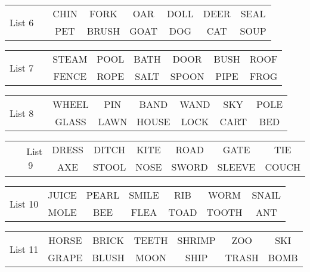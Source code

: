 \documentclass{article}
\begin{document}
\vspace{.1in}
\hspace{.5in}\begin{tabular}{r||c c c c c c }
\multirow{2}{*}{List 6~~} & CHIN & FORK & OAR & DOLL & DEER & SEAL\\
\cline{2-7}			& PET & BRUSH & GOAT & DOG & CAT & SOUP\\
\end{tabular}

\vspace{.1in}
\hspace{.5in}\begin{tabular}{r||c c c c c c }
\multirow{2}{*}{List 7~~} & STEAM & POOL & BATH & DOOR & BUSH & ROOF\\
\cline{2-7}			& FENCE & ROPE & SALT & SPOON & PIPE & FROG\\
\end{tabular}

\vspace{.1in}
\hspace{.5in}\begin{tabular}{r||c c c c c c }
\multirow{2}{*}{List 8~~} & WHEEL & PIN & BAND & WAND & SKY & POLE\\
\cline{2-7}			& GLASS & LAWN & HOUSE & LOCK & CART & BED\\
\end{tabular}

\vspace{.1in}
\hspace{.5in}\begin{tabular}{r||c c c c c c }
\multirow{2}{*}{List 9~~} & DRESS & DITCH & KITE & ROAD & GATE & TIE\\
\cline{2-7}			& AXE & STOOL & NOSE & SWORD & SLEEVE & COUCH\\
\end{tabular}

\vspace{.1in}
\hspace{.5in}\begin{tabular}{r||c c c c c c }
\multirow{2}{*}{List 10} & JUICE & PEARL & SMILE & RIB & WORM & SNAIL\\
\cline{2-7}			& MOLE & BEE & FLEA & TOAD & TOOTH & ANT\\
\end{tabular}

\vspace{.1in}
\hspace{.5in}\begin{tabular}{r||c c c c c c }
\multirow{2}{*}{List 11} & HORSE & BRICK & TEETH & SHRIMP & ZOO & SKI\\
\cline{2-7}			& GRAPE & BLUSH & MOON & SHIP & TRASH & BOMB\\
\end{tabular}
\end{document}
